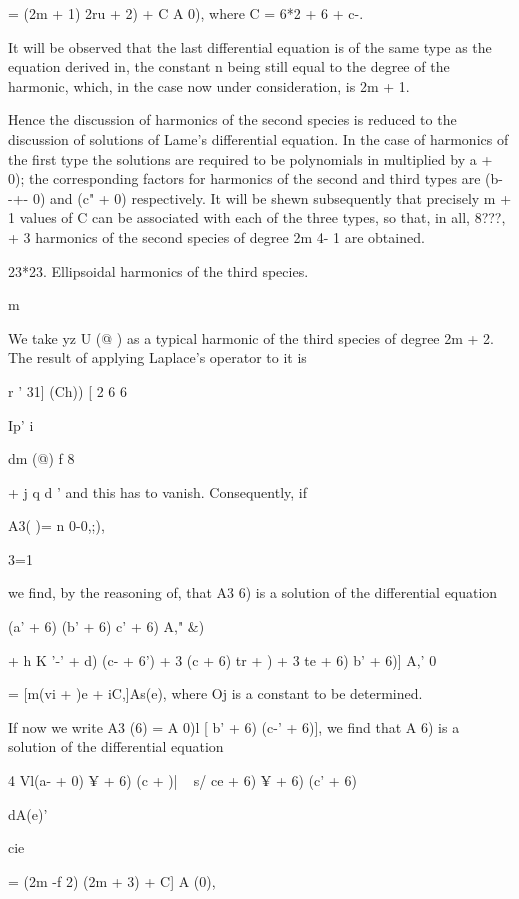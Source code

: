 {= (2m + 1) 2ru + 2) + C A 0), where C = 6*2 + 6 + c-.

It will be observed that the last differential equation is of the same
type as the equation derived in, the constant n being still
equal to the degree of the harmonic, which, in the case now under
consideration, is 2m + 1.

Hence the discussion of harmonics of the second species is reduced to
the discussion of solutions of Lame's differential equation. In the
case of harmonics of the first type the solutions are required to be
polynomials in multiplied by \/ a + 0); the corresponding factors for
harmonics of the second and third types are \/(b- -+- 0) and (c" + 0)
respectively. It will be shewn subsequently that precisely m + 1
values of C can be associated with each of the three types, so that,
in all, 8???, + 3 harmonics of the second species of degree 2m 4- 1
are obtained.

23*23. Ellipsoidal harmonics of the third species.

m

We take yz U (@ ) as a typical harmonic of the third species of degree
2m + 2. The result of applying Laplace's operator to it is

r ' 31] (Ch)) [ 2 6 6

 Ip' i %

  dm (@) f 8 %

+ j q d%
' and this has to vanish. Consequently, if

A3( )= n 0-0,;),

3=1

%
%

we find, by the reasoning of, that A3 6) is a solution of the
differential equation

(a' + 6) (b' + 6) c' + 6) A," \&)

+ h K '-' + d) (c- + 6') + 3 (c + 6) tr + ) + 3 te + 6) b' + 6)] A,' 0

= [m(vi + )e + iC,]As(e), where Oj is a constant to be determined.

If now we write A3 (6) = A 0)l [ b' + 6) (c-' + 6)], we find that A 6)
is a solution of the differential equation

4 Vl(a- + 0) ¥ + 6) (c + )| ~ s/ ce + 6) ¥ + 6) (c' + 6)

dA(e)'

cie

= (2m -f 2) (2m + 3) + C] A (0),

}
